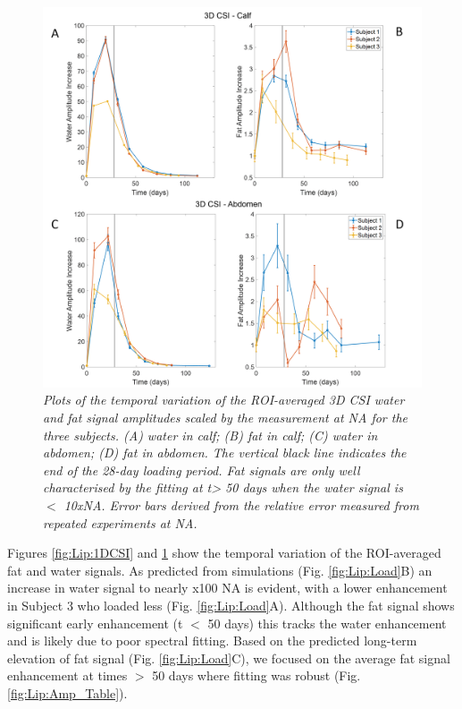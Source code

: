 \begin{figure}
    \centering
    \includegraphics[width=1\textwidth]{Figures/Lipid/3DCSI_Amplitude.png}
    \caption{\textit{Plots of the temporal variation of the \ac{ROI}-averaged 3D \ac{CSI} water and fat signal amplitudes scaled by the measurement at \ac{NA} for the three subjects. (A) water in calf; (B) fat in calf; (C) water in abdomen; (D) fat in abdomen. The vertical black line indicates the end of the 28-day loading period. Fat signals are only well characterised by the fitting at t> 50 days when the water signal is $<$ 10x\ac{NA}.  Error bars derived from the relative error measured from repeated experiments at NA.}}
    \label{fig:Lip:3DCSI}
\end{figure}

Figures \ref{fig:Lip:1DCSI} and \ref{fig:Lip:3DCSI} show the temporal variation of the \ac{ROI}-averaged fat and water signals. As predicted from simulations (Fig. \ref{fig:Lip:Load}B) an increase in water signal to nearly x100 \ac{NA} is evident, with a lower enhancement in Subject 3 who loaded less (Fig. \ref{fig:Lip:Load}A). Although the fat signal shows significant early enhancement (t $<$ 50 days) this tracks the water enhancement and is likely due to poor spectral fitting. Based on the predicted long-term elevation of fat signal (Fig. \ref{fig:Lip:Load}C), we focused on the average fat signal enhancement at times $>$ 50 days where fitting was robust (Fig. \ref{fig:Lip:Amp_Table}). 

